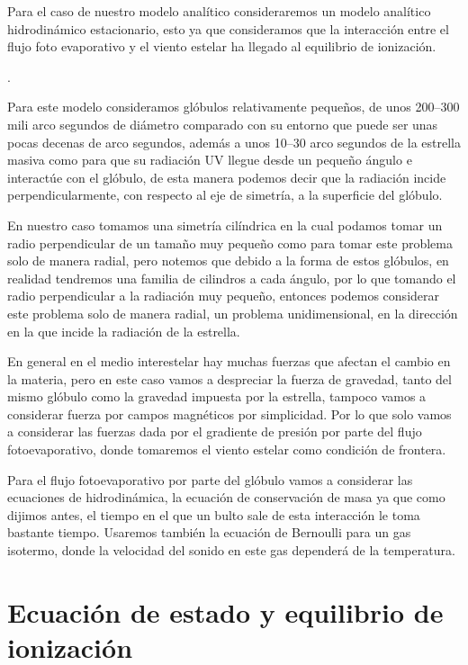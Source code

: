 \documentclass{book}
\begin{document}
Para el caso de nuestro modelo analítico consideraremos un modelo analítico hidrodinámico estacionario, esto ya que consideramos que la interacción entre el flujo foto evaporativo y el viento estelar ha llegado al equilibrio de ionización.

.

Para este modelo consideramos glóbulos relativamente pequeños, de unos 200--300 mili arco segundos de diámetro comparado con su entorno que puede ser unas pocas decenas de arco segundos, además a unos 10--30 arco segundos de la estrella masiva como para que su radiación UV llegue desde un pequeño ángulo e interactúe con el glóbulo, de esta manera podemos decir que la radiación incide perpendicularmente, con respecto al eje de simetría, a la superficie del glóbulo.

En nuestro caso tomamos una simetría cilíndrica en la cual podamos tomar un radio perpendicular de un tamaño muy pequeño como para tomar este problema solo de manera radial, pero notemos que debido a la forma de estos glóbulos, en realidad tendremos una familia de cilindros a cada ángulo, por lo que tomando el radio perpendicular a la radiación muy pequeño, entonces podemos considerar este problema solo de manera radial, un problema unidimensional, en la dirección en la que incide la radiación de la estrella.

En general en el medio interestelar hay muchas fuerzas que afectan el cambio en la materia, pero en este caso vamos a despreciar la fuerza de gravedad, tanto del mismo glóbulo como la gravedad impuesta por la estrella, tampoco vamos a considerar fuerza por campos magnéticos por simplicidad. Por lo que solo vamos a considerar las fuerzas dada por el gradiente de presión por parte del flujo fotoevaporativo, donde tomaremos el viento estelar como condición de frontera.

Para el flujo fotoevaporativo por parte del glóbulo vamos a considerar las ecuaciones de hidrodinámica, la ecuación de conservación de masa ya que como dijimos antes, el tiempo en el que un bulto sale de esta interacción le toma bastante tiempo. Usaremos también la ecuación de Bernoulli para un gas isotermo, donde la velocidad del sonido en este gas dependerá de la temperatura.


\section{Ecuación de estado y equilibrio de ionización}
\end{document}
